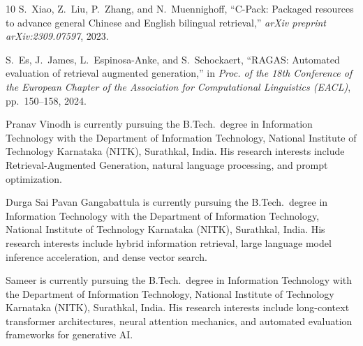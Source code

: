 \documentclass[lettersize,journal]{IEEEtran}
\begin{document}
\begin{thebibliography}{10}
S.~Xiao, Z.~Liu, P.~Zhang, and N.~Muennighoff, ``C-Pack: Packaged resources to advance general Chinese and English bilingual retrieval,'' \textit{arXiv preprint arXiv:2309.07597}, 2023.

S.~Es, J.~James, L.~Espinosa-Anke, and S.~Schockaert, ``RAGAS: Automated evaluation of retrieval augmented generation,'' in \textit{Proc. of the 18th Conference of the European Chapter of the Association for Computational Linguistics (EACL)}, pp.~150--158, 2024.
\end{thebibliography}

\begin{IEEEbiographynophoto}{Pranav Vinodh}
is currently pursuing the B.Tech.\ degree in Information Technology with the Department of Information Technology, National Institute of Technology Karnataka (NITK), Surathkal, India. His research interests include Retrieval-Augmented Generation, natural language processing, and prompt optimization.
\end{IEEEbiographynophoto}

\begin{IEEEbiographynophoto}{Durga Sai Pavan Gangabattula}
is currently pursuing the B.Tech.\ degree in Information Technology with the Department of Information Technology, National Institute of Technology Karnataka (NITK), Surathkal, India. His research interests include hybrid information retrieval, large language model inference acceleration, and dense vector search.
\end{IEEEbiographynophoto}

\begin{IEEEbiographynophoto}{Sameer}
is currently pursuing the B.Tech.\ degree in Information Technology with the Department of Information Technology, National Institute of Technology Karnataka (NITK), Surathkal, India. His research interests include long-context transformer architectures, neural attention mechanics, and automated evaluation frameworks for generative AI.
\end{IEEEbiographynophoto}

\vfill
\end{document}
